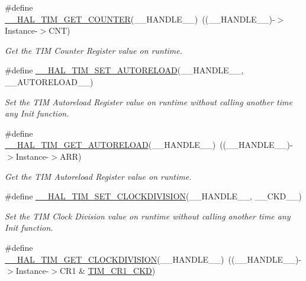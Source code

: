 \begin{DoxyCompactItemize}
\#define \hyperlink{group___t_i_m___exported___macros_gaf1af08014b9d06efbbb091d58d47c8ba}{\+\_\+\+\_\+\+H\+A\+L\+\_\+\+T\+I\+M\+\_\+\+G\+E\+T\+\_\+\+C\+O\+U\+N\+T\+ER}(\+\_\+\+\_\+\+H\+A\+N\+D\+L\+E\+\_\+\+\_\+)~((\+\_\+\+\_\+\+H\+A\+N\+D\+L\+E\+\_\+\+\_\+)-\/$>$Instance-\/$>$C\+NT)
\begin{DoxyCompactList}\small\item\em Get the T\+IM Counter Register value on runtime. \end{DoxyCompactList}\item 
\#define \hyperlink{group___t_i_m___exported___macros_ga1e6300cab1e34ecaaf490dc7d4812d69}{\+\_\+\+\_\+\+H\+A\+L\+\_\+\+T\+I\+M\+\_\+\+S\+E\+T\+\_\+\+A\+U\+T\+O\+R\+E\+L\+O\+AD}(\+\_\+\+\_\+\+H\+A\+N\+D\+L\+E\+\_\+\+\_\+,  \+\_\+\+\_\+\+A\+U\+T\+O\+R\+E\+L\+O\+A\+D\+\_\+\+\_\+)
\begin{DoxyCompactList}\small\item\em Set the T\+IM Autoreload Register value on runtime without calling another time any Init function. \end{DoxyCompactList}\item 
\#define \hyperlink{group___t_i_m___exported___macros_gaa7a5c7645695bad15bacd402513a028a}{\+\_\+\+\_\+\+H\+A\+L\+\_\+\+T\+I\+M\+\_\+\+G\+E\+T\+\_\+\+A\+U\+T\+O\+R\+E\+L\+O\+AD}(\+\_\+\+\_\+\+H\+A\+N\+D\+L\+E\+\_\+\+\_\+)~((\+\_\+\+\_\+\+H\+A\+N\+D\+L\+E\+\_\+\+\_\+)-\/$>$Instance-\/$>$A\+RR)
\begin{DoxyCompactList}\small\item\em Get the T\+IM Autoreload Register value on runtime. \end{DoxyCompactList}\item 
\#define \hyperlink{group___t_i_m___exported___macros_ga8aa84d77c670890408092630f9b2bdc4}{\+\_\+\+\_\+\+H\+A\+L\+\_\+\+T\+I\+M\+\_\+\+S\+E\+T\+\_\+\+C\+L\+O\+C\+K\+D\+I\+V\+I\+S\+I\+ON}(\+\_\+\+\_\+\+H\+A\+N\+D\+L\+E\+\_\+\+\_\+,  \+\_\+\+\_\+\+C\+K\+D\+\_\+\+\_\+)
\begin{DoxyCompactList}\small\item\em Set the T\+IM Clock Division value on runtime without calling another time any Init function. \end{DoxyCompactList}\item 
\#define \hyperlink{group___t_i_m___exported___macros_gae6bc91bb5940bce52828c690f24001b8}{\+\_\+\+\_\+\+H\+A\+L\+\_\+\+T\+I\+M\+\_\+\+G\+E\+T\+\_\+\+C\+L\+O\+C\+K\+D\+I\+V\+I\+S\+I\+ON}(\+\_\+\+\_\+\+H\+A\+N\+D\+L\+E\+\_\+\+\_\+)~((\+\_\+\+\_\+\+H\+A\+N\+D\+L\+E\+\_\+\+\_\+)-\/$>$Instance-\/$>$C\+R1 \& \hyperlink{group___peripheral___registers___bits___definition_gacacc4ff7e5b75fd2e4e6b672ccd33a72}{T\+I\+M\+\_\+\+C\+R1\+\_\+\+C\+KD})

\end{DoxyCompactItemize}
